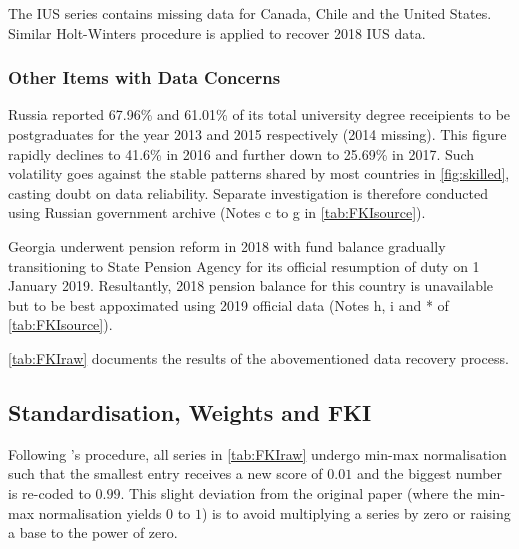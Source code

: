 \documentclass[a4paper,11pt,UKenglish,twoside,openright]{report}\usepackage[]{graphicx}\usepackage[]{color}
\begin{document}

The IUS series contains missing data for Canada, Chile and the United States. Similar Holt-Winters procedure is applied to recover 2018 IUS data.



\subsubsection{Other Items with Data Concerns}

Russia reported 67.96\% and 61.01\% of its total university degree receipients to be postgraduates for the year 2013 and 2015 respectively (2014 missing). This figure rapidly declines to 41.6\% in 2016 and further down to 25.69\% in 2017. Such volatility goes against the stable patterns shared by most countries in \cref{fig:skilled}, casting doubt on data reliability. Separate investigation is therefore conducted using Russian government archive (Notes c to g in \cref{tab:FKIsource}).

Georgia underwent pension reform in 2018 with fund balance gradually transitioning to State Pension Agency for its official resumption of duty on 1 January 2019. Resultantly, 2018 pension balance for this country is unavailable but to be best appoximated using 2019 official data (Notes h, i and * of \cref{tab:FKIsource}).

\cref{tab:FKIraw} documents the results of the abovementioned data recovery process.

\subsection{Standardisation, Weights and FKI}

Following \textcite{olivermarquez:2020}'s procedure, all series in \cref{tab:FKIraw} undergo min-max normalisation such that the smallest entry receives a new score of $0.01$ and the biggest number is re-coded to $0.99$. This slight deviation from the original paper (where the min-max normalisation yields $0$ to $1$) is to avoid multiplying a series by zero or raising a base to the power of zero.
\end{document}
